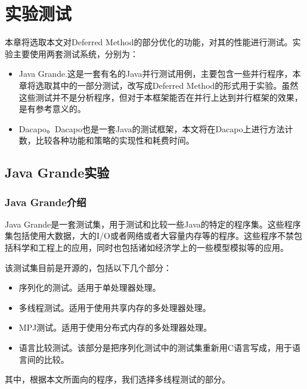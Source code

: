 
\chapter{实验测试}

本章将选取本文对Deferred Method的部分优化的功能，对其的性能进行测试。实验主要使用两套测试系统，分别为：

\begin{itemize}
	\item Java Grande.这是一套有名的Java并行测试用例，主要包含一些并行程序，本章将选取其中的一部分测试，改写成Deferred Method的形式用于实验。虽然这些测试并不是分析程序，但对于本框架能否在并行上达到并行框架的效果，是有参考意义的。
	\item Dacapo。Dacapo也是一套Java的测试框架，本文将在Dacapo上进行方法计数，比较各种功能和策略的实现性和耗费时间。
\end{itemize}

\section{Java Grande实验}

\subsection{Java Grande介绍}

Java Grande\cite{javagrande}是一套测试集，用于测试和比较一些Java的特定的程序集。这些程序集包括使用大数据，大的I/O或者网络或者大容量内存等的程序。这些程序不禁包括科学和工程上的应用，同时也包括诸如经济学上的一些模型模拟等的应用。

该测试集目前是开源的，包括以下几个部分：

\begin{itemize}
	\item 序列化的测试。适用于单处理器处理。
	\item 多线程测试。适用于使用共享内存的多处理器处理。
	\item MPJ测试。适用于使用分布式内存的多处理器处理。
	\item 语言比较测试。该部分是把序列化测试中的测试集重新用C语言写成，用于语言间的比较。
\end{itemize}

其中，根据本文所面向的程序，我们选择多线程测试的部分。

